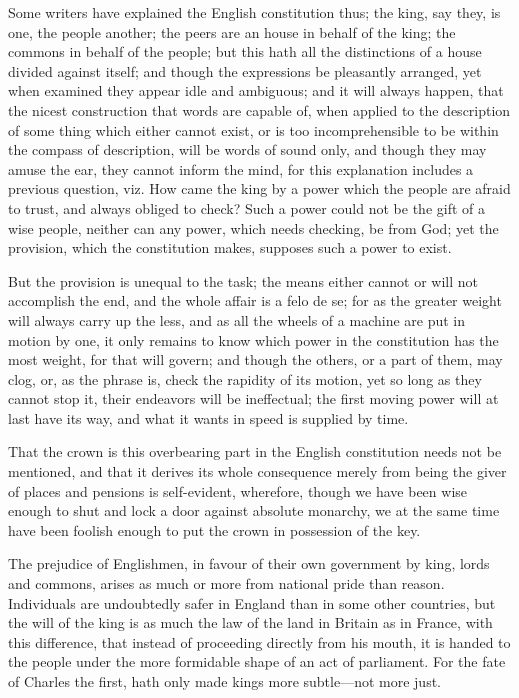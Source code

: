 \documentclass[12pt,oneside]{memoir}
\begin{document}
Some writers have explained the English constitution thus; the king, say they, is one, the people another; the peers are an house in behalf of the king; the commons in behalf of the people; but this hath all the distinctions of a house divided against itself; and though the expressions be pleasantly arranged, yet when examined they appear idle and ambiguous; and it will always happen, that the nicest construction that words are capable of, when applied to the description of some thing which either cannot exist, or is too incomprehensible to be within the compass of description, will be words of sound only, and though they may amuse the ear, they cannot inform the mind, for this explanation includes a previous question, viz. How came the king by a power which the people are afraid to trust, and always obliged to check? Such a power could not be the gift of a wise people, neither can any power, which needs checking, be from God; yet the provision, which the constitution makes, supposes such a power to exist.

But the provision is unequal to the task; the means either cannot or will not accomplish the end, and the whole affair is a felo de se; for as the greater weight will always carry up the less, and as all the wheels of a machine are put in motion by one, it only remains to know which power in the constitution has the most weight, for that will govern; and though the others, or a part of them, may clog, or, as the phrase is, check the rapidity of its motion, yet so long as they cannot stop it, their endeavors will be ineffectual; the first moving power will at last have its way, and what it wants in speed is supplied by time.

That the crown is this overbearing part in the English constitution needs not be mentioned, and that it derives its whole consequence merely from being the giver of places and pensions is self-evident, wherefore, though we have been wise enough to shut and lock a door against absolute monarchy, we at the same time have been foolish enough to put the crown in possession of the key.

The prejudice of Englishmen, in favour of their own government by king, lords and commons, arises as much or more from national pride than reason. Individuals are undoubtedly safer in England than in some other countries, but the will of the king is as much the law of the land in Britain as in France, with this difference, that instead of proceeding directly from his mouth, it is handed to the people under the more formidable shape of an act of parliament. For the fate of Charles the first, hath only made kings more subtle---not more just.
\end{document}
